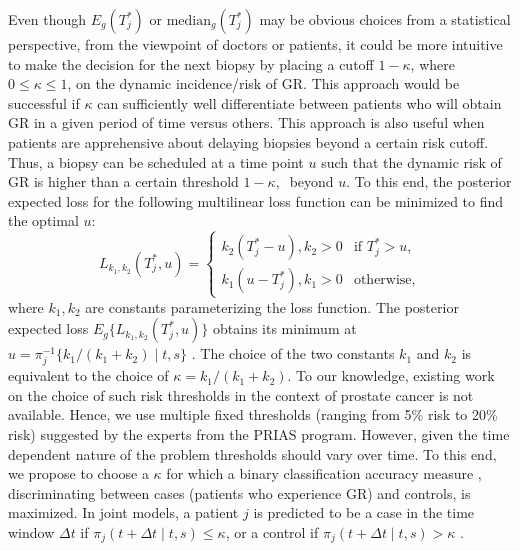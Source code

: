 Even though $E_g(T^*_j)$ or $\mbox{median}_g(T^*_j)$ may be obvious choices from a statistical perspective, from the viewpoint of doctors or patients, it could be more intuitive to make the decision for the next biopsy by placing a cutoff $1 - \kappa$, where $0 \leq \kappa \leq 1$, on the dynamic incidence/risk of GR. This approach would be successful if $\kappa$ can sufficiently well differentiate between patients who will obtain GR in a given period of time versus others. This approach is also useful when patients are apprehensive about delaying biopsies beyond a certain risk cutoff. Thus, a biopsy can be scheduled at a time point $u$ such that the dynamic risk of GR is higher than a certain threshold $1 - \kappa,\ $ beyond $u$. To this end, the posterior expected loss for the following multilinear loss function can be minimized to find the optimal $u$:
\begin{equation*}
\label{eq : loss_dynamic_risk}
L_{k_1, k_2}(T^*_j, u) =
    \begin{cases}
      k_2(T^*_j-u), k_2>0 & \text{if } T^*_j > u,\\
      k_1(u-T^*_j), k_1>0 & \text{otherwise},
    \end{cases}       
\end{equation*}
where $k_1, k_2$ are constants parameterizing the loss function. The posterior expected loss $E_g\big\{L_{k_1, k_2}(T^*_j, u)\big\}$ obtains its minimum at $u = \pi_j^{-1}\big\{k_1/{(k_1 + k_2)} \mid t,s \big\}$ \citep{robertBayesianChoice}. The choice of the two constants $k_1$ and $k_2$ is equivalent to the choice of $\kappa = {k_1}/{(k_1 + k_2)}$. To our knowledge, existing work on the choice of such risk thresholds in the context of prostate cancer is not available. Hence, we use multiple fixed thresholds (ranging from 5\% risk to 20\% risk)  suggested by the experts from the PRIAS program. However, given the time dependent nature of the problem thresholds should vary over time. To this end, we propose to choose a $\kappa$ for which a binary classification accuracy measure \citep{lopez2014optimalcutpoints}, discriminating between cases (patients who experience GR) and controls, is maximized. In joint models, a patient $j$ is predicted to be a case in the time window $\Delta t$ if $\pi_j(t + \Delta t \mid t,s) \leq \kappa$, or a control if $\pi_j(t + \Delta t \mid t,s) > \kappa$ \citep*{rizopoulosJMbayes, landmarking2017}.

